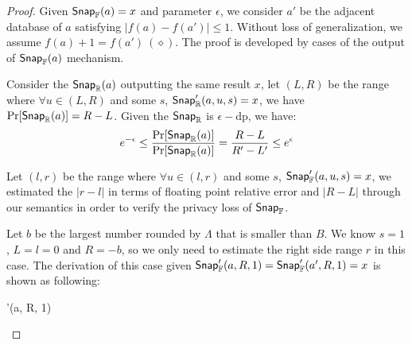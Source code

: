 \documentclass[a4paper,11pt]{article}
\begin{document}
\begin{proof}

Given $\mathsf{Snap}_{\mathbb{F}}(a) = x$ and parameter $\epsilon$, we consider $a'$ be the adjacent database of $a$ satisfying $|f(a) - f(a')| \leq 1$.
Without loss of generalization, we assume $f(a) + 1 = f(a') ~ (\diamond)$.
The proof is developed by cases of the output of $\mathsf{Snap}_{\mathbb{F}}(a)$ mechanism.
%

%
Consider the $\mathsf{Snap}_{\mathbb{R}}(a)$ outputting the same result $x$, let $(L, R)$ be the range where $\forall u \in (L, R)$ and some $s$, $\mathsf{Snap}_{\mathbb{R}}'(a, u, s) = x$, we have $\Pr[\mathsf{Snap}_{\mathbb{R}}(a)] = R - L$. Given the $\mathsf{Snap}_{\mathbb{R}}$ is $\epsilon-$dp, we have:
\[
	e^{-\epsilon} \leq \frac{\Pr[\mathsf{Snap}_{\mathbb{R}}(a)]}{\Pr[\mathsf{Snap}_{\mathbb{R}}(a)]} = \frac{R - L}{R' - L'} \leq e^{\epsilon}
\]
%

%
Let $(l, r)$ be the range where $\forall u \in (l, r)$ and some $s$, $\mathsf{Snap}_{\mathbb{F}}'(a, u, s) = x$, we estimated the $|r - l|$ in terms of floating point relative error and $|R - L|$ through our semantics in order to verify the privacy loss of $\mathsf{Snap}_{\mathbb{F}}$.
	\begin{itemize}
		Let $b$ be the largest number rounded by $\Lambda$ that is smaller than $B$.
		We know $s = 1$, $L = l = 0$ and $R = -b$, so we only need to estimate the right side range $r$ in this case. The derivation of this case given $\mathsf{Snap}_{\mathbb{F}}'(a, R, 1) = \mathsf{Snap}_{\mathbb{F}}'(a', R, 1) = x$ is shown as following:
		\begin{mathpar}
		{
			{
				{
					{
						\rsnap'(a, R, 1)
}}}}
\end{mathpar}
\end{itemize}
\end{proof}
\end{document}

